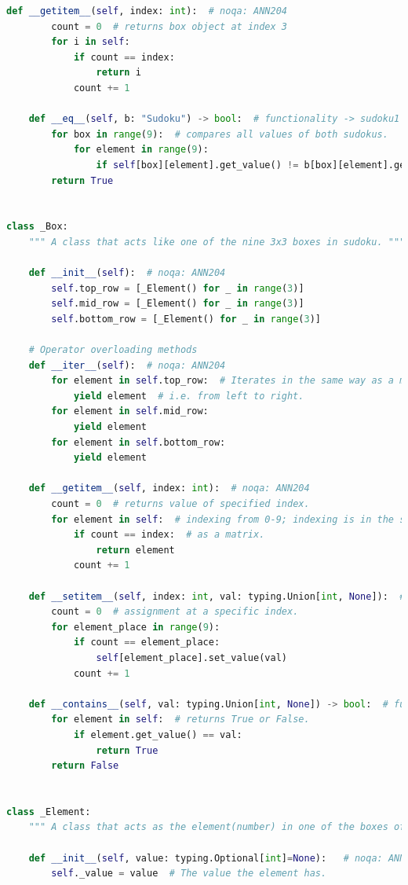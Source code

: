 \documentclass[12pt, a4paper]{report}
\begin{document}
\begin{lstlisting}[language=Python, caption=utils/classes.py]
    def __getitem__(self, index: int):  # noqa: ANN204
        count = 0  # returns box object at index 3
        for i in self:
            if count == index:
                return i
            count += 1

    def __eq__(self, b: "Sudoku") -> bool:  # functionality -> sudoku1 == sudoku2
        for box in range(9):  # compares all values of both sudokus.
            for element in range(9):
                if self[box][element].get_value() != b[box][element].get_value(): return False
        return True


class _Box:
    """ A class that acts like one of the nine 3x3 boxes in sudoku. """

    def __init__(self):  # noqa: ANN204
        self.top_row = [_Element() for _ in range(3)]
        self.mid_row = [_Element() for _ in range(3)]
        self.bottom_row = [_Element() for _ in range(3)]

    # Operator overloading methods
    def __iter__(self):  # noqa: ANN204
        for element in self.top_row:  # Iterates in the same way as a matrix
            yield element  # i.e. from left to right.
        for element in self.mid_row:
            yield element
        for element in self.bottom_row:
            yield element

    def __getitem__(self, index: int):  # noqa: ANN204
        count = 0  # returns value of specified index.
        for element in self:  # indexing from 0-9; indexing is in the same way
            if count == index:  # as a matrix.
                return element
            count += 1

    def __setitem__(self, index: int, val: typing.Union[int, None]):  # noqa: ANN204
        count = 0  # assignment at a specific index.
        for element_place in range(9):
            if count == element_place:
                self[element_place].set_value(val)
            count += 1

    def __contains__(self, val: typing.Union[int, None]) -> bool:  # functionality -> val in box
        for element in self:  # returns True or False.
            if element.get_value() == val:
                return True
        return False


class _Element:
    """ A class that acts as the element(number) in one of the boxes of sudoku. """

    def __init__(self, value: typing.Optional[int]=None):   # noqa: ANN204
        self._value = value  # The value the element has.


\end{lstlisting}
\end{document}

